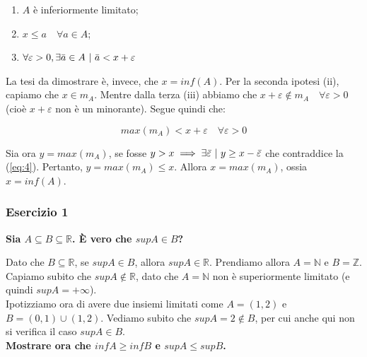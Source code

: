 \documentclass{article}
\begin{document}
\begin{enumerate}[label=\roman*)]
    \item $A$ è inferiormente limitato;
    \item $x \leq a \quad \forall a \in A$;
    \item $\forall \varepsilon > 0, \exists \Bar{a} \in A \ | \ \Bar{a} < x + \varepsilon$
\end{enumerate}

\noindent La tesi da dimostrare è, invece, che $x = inf(A)$. Per la seconda ipotesi (ii), capiamo che $x \in m_A$. Mentre dalla terza (iii) abbiamo che $x + \varepsilon \notin m_A \quad \forall \varepsilon > 0$ (cioè $x + \varepsilon$ non è un minorante). Segue quindi che:

\begin{equation}
    max(m_A) < x + \varepsilon \quad \forall \varepsilon > 0
    \label{eq:4}
\end{equation}

\noindent Sia ora $y = max(m_A)$, se fosse $y > x \implies \exists \Bar{\varepsilon} \ | \ y \geq x - \Bar{\varepsilon}$ che contraddice la (\ref{eq:4}). Pertanto, $y = max(m_A) \leq x$. Allora $x = max(m_A)$, ossia $x = inf(A)$.

\subsubsection{Esercizio 1}
\textbf{Sia $A \subseteq B \subseteq \mathbb{R}$. È vero che $supA \in B$? }

\noindent Dato che $B \subseteq \mathbb{R}$, se $supA \in B$, allora $supA \in \mathbb{R}$. Prendiamo allora $A = \mathbb{N}$ e $B = \mathbb{Z}$. Capiamo subito che $supA \notin \mathbb{R}$, dato che $A = \mathbb{N}$ non è superiormente limitato (e quindi $supA = + \infty$).\\
Ipotizziamo ora di avere due insiemi limitati come $A = (1,2)$ e $B = (0,1) \cup (1,2)$. Vediamo subito che $supA = 2 \notin B$, per cui anche qui non si verifica il caso $supA \in B$.\\

\noindent \textbf{Mostrare ora che $infA \geq infB$ e $supA \leq supB$.}
\end{document}
